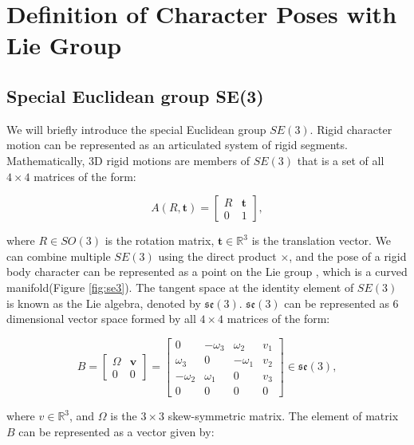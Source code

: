 \section{Definition of Character Poses with Lie Group}
\label{sec:LigGroup}
\subsection{Special Euclidean group SE(3)}

We will briefly introduce the special Euclidean group $SE(3)$. Rigid character motion can be represented as an articulated system of rigid segments\cite{zatsiorsky2002kinetics}. Mathematically, 3D rigid motions are members of $SE(3)$\cite{murray1994mathematical} that is a set of all $4 \times 4$ matrices of the form:

\begin{equation}
	A(R,\mathbf{t}) =
		\begin{bmatrix}
			R & \mathbf{t}\\ 
			0 & 1
		\end{bmatrix},
\end{equation}

where $R \in SO(3)$ is the rotation matrix, $\mathbf{t} \in \mathbb{R}^{3}$ is the translation vector. We can combine multiple $SE(3)$ using the direct product $\times{}$, and the pose of a rigid body character can be represented as a point on the Lie group \SE{}, which is a curved manifold(Figure \ref{fig:se3}).
The tangent space at the identity element of $SE(3)$ is known as the Lie algebra, denoted by $\mathfrak{se}(3)$. $\mathfrak{se}(3)$ can be represented as 6 dimensional vector space formed by all $4 \times 4$ matrices of the form:

\begin{equation}
	B =
	\begin{bmatrix}
		\Omega  & \mathbf{v}\\ 
		0 & 0
	\end{bmatrix}
	=
	\begin{bmatrix}
		0 & -\omega_{3} & \omega_{2} & v_{1}\\ 
		\omega_{3} & 0 & -\omega_{1} & v_{2}\\ 
		-\omega_{2} & \omega_{1} & 0 & v_{3}\\ 
		0 & 0 & 0 & 0
	\end{bmatrix}
	\in \mathfrak{se}(3),
\end{equation}

where $v \in \mathbb{R}^{3}$, and $\Omega$ is the $3\times3$ skew-symmetric matrix. The element of matrix $B$ can be represented as a vector given by:

